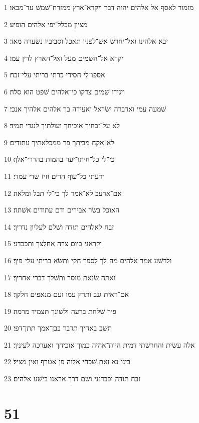 \par 1 מזמור לאסף אל אלהים יהוה דבר ויקרא־ארץ ממזרח־שׁמשׁ עד־מבאו׃
\par 2 מציון מכלל־יפי אלהים הופיע׃
\par 3 יבא אלהינו ואל־יחרשׁ אשׁ־לפניו תאכל וסביביו נשׂערה מאד׃
\par 4 יקרא אל־השׁמים מעל ואל־הארץ לדין עמו׃
\par 5 אספו־לי חסידי כרתי בריתי עלי־זבח׃
\par 6 ויגידו שׁמים צדקו כי־אלהים שׁפט הוא סלה׃
\par 7 שׁמעה עמי ואדברה ישׂראל ואעידה בך אלהים אלהיך אנכי׃
\par 8 לא על־זבחיך אוכיחך ועולתיך לנגדי תמיד׃
\par 9 לא־אקח מביתך פר ממכלאתיך עתודים׃
\par 10 כי־לי כל־חיתו־יער בהמות בהררי־אלף׃
\par 11 ידעתי כל־עוף הרים וזיז שׂדי עמדי׃
\par 12 אם־ארעב לא־אמר לך כי־לי תבל ומלאה׃
\par 13 האוכל בשׂר אבירים ודם עתודים אשׁתה׃
\par 14 זבח לאלהים תודה ושׁלם לעליון נדריך׃
\par 15 וקראני ביום צרה אחלצך ותכבדני׃
\par 16 ולרשׁע אמר אלהים מה־לך לספר חקי ותשׂא בריתי עלי־פיך׃
\par 17 ואתה שׂנאת מוסר ותשׁלך דברי אחריך׃
\par 18 אם־ראית גנב ותרץ עמו ועם מנאפים חלקך׃
\par 19 פיך שׁלחת ברעה ולשׁונך תצמיד מרמה׃
\par 20 תשׁב באחיך תדבר בבן־אמך תתן־דפי׃
\par 21 אלה עשׂית והחרשׁתי דמית היות־אהיה כמוך אוכיחך ואערכה לעיניך׃
\par 22 בינו־נא זאת שׁכחי אלוה פן־אטרף ואין מציל׃
\par 23 זבח תודה יכבדנני ושׂם דרך אראנו בישׁע אלהים׃

\chapter{51}

